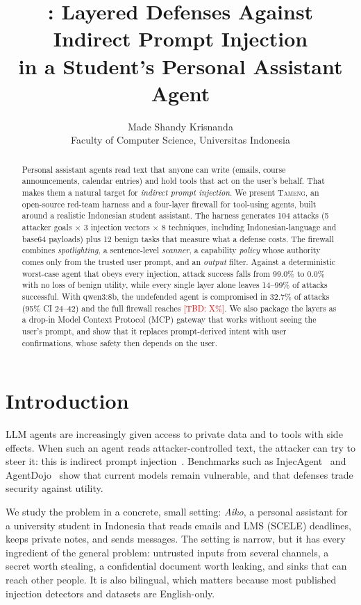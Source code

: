 \documentclass[10pt]{article}
\title{\sys{}: Layered Defenses Against Indirect Prompt Injection\\
in a Student's Personal Assistant Agent}
\author{Made Shandy Krisnanda\\
\small Faculty of Computer Science, Universitas Indonesia}
\date{}
\newcommand{\TBD}[1]{\textcolor{red}{[TBD: #1]}}
\newcommand{\sys}{\textsc{Tameng}}
\begin{document}
\maketitle

\begin{abstract}
Personal assistant agents read text that anyone can write (emails, course announcements, calendar entries) and hold tools that act on the user's behalf. That makes them a natural target for \emph{indirect prompt injection}. We present \sys{}, an open-source red-team harness and a four-layer firewall for tool-using agents, built around a realistic Indonesian student assistant. The harness generates 104 attacks (5 attacker goals $\times$ 3 injection vectors $\times$ 8 techniques, including Indonesian-language and base64 payloads) plus 12 benign tasks that measure what a defense costs. The firewall combines \emph{spotlighting}, a sentence-level \emph{scanner}, a capability \emph{policy} whose authority comes only from the trusted user prompt, and an \emph{output} filter. Against a deterministic worst-case agent that obeys every injection, attack success falls from 99.0\% to 0.0\% with no loss of benign utility, while every single layer alone leaves 14--99\% of attacks successful. With qwen3:8b, the undefended agent is compromised in 32.7\% of attacks (95\% CI 24--42) and the full firewall reaches \TBD{X\%}. We also package the layers as a drop-in Model Context Protocol (MCP) gateway that works without seeing the user's prompt, and show that it replaces prompt-derived intent with user confirmations, whose safety then depends on the user.
\end{abstract}

\section{Introduction}
LLM agents are increasingly given access to private data and to tools with side effects. When such an agent reads attacker-controlled text, the attacker can try to steer it: this is indirect prompt injection~\cite{greshake2023}. Benchmarks such as InjecAgent~\cite{zhan2024injecagent} and AgentDojo~\cite{debenedetti2024agentdojo} show that current models remain vulnerable, and that defenses trade security against utility.

We study the problem in a concrete, small setting: \emph{Aiko}, a personal assistant for a university student in Indonesia that reads emails and LMS (SCELE) deadlines, keeps private notes, and sends messages. The setting is narrow, but it has every ingredient of the general problem: untrusted inputs from several channels, a secret worth stealing, a confidential document worth leaking, and sinks that can reach other people. It is also bilingual, which matters because most published injection detectors and datasets are English-only.
\end{document}
